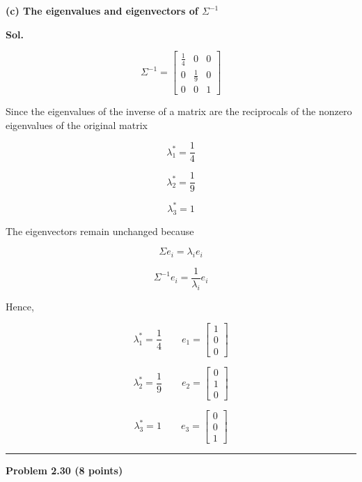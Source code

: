 \documentclass[12pt]{article}
\begin{document}
\vspace{1cm}

\noindent
\textbf{(c) The eigenvalues and eigenvectors of \(\Sigma^{-1}\)}

\vspace{0.5cm}

\noindent
\textbf{Sol.}

\vspace{0.3cm}

\[
\Sigma^{-1}
=
\begin{bmatrix}
\frac{1}{4} & 0 & 0\\
0 & \frac{1}{9} & 0\\
0 & 0 & 1
\end{bmatrix}
\]

\noindent
Since the eigenvalues of the inverse of a matrix are the reciprocals of the nonzero eigenvalues of the original matrix

\[
\lambda_1^*
=
\frac{1}{4}
\]

\[
\lambda_2^*
=
\frac{1}{9}
\]

\[
\lambda_3^*
=
1
\]

\noindent
The eigenvectors remain unchanged because

\[
\Sigma e_i=\lambda_i e_i
\]

\[
\Sigma^{-1}e_i
=
\frac{1}{\lambda_i}e_i
\]

\noindent
Hence,

\[
\boxed{
\lambda_1^*=\frac{1}{4}
\qquad
e_1=
\begin{bmatrix}
1\\
0\\
0
\end{bmatrix}
}
\]

\[
\boxed{
\lambda_2^*=\frac{1}{9}
\qquad
e_2=
\begin{bmatrix}
0\\
1\\
0
\end{bmatrix}
}
\]

\[
\boxed{
\lambda_3^*=1
\qquad
e_3=
\begin{bmatrix}
0\\
0\\
1
\end{bmatrix}
}
\]

\vspace{1cm}

\hrule

\vspace{0.7cm}

\noindent
\textbf{Problem 2.30 (8 points)}
\end{document}
